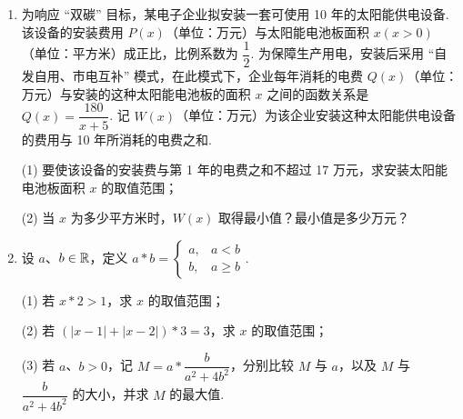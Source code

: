 \documentclass[a4paper,11pt]{article}
\begin{document}
\begin{enumerate}
\item 为响应 “双碳” 目标，某电子企业拟安装一套可使用 10 年的太阳能供电设备. 该设备的安装费用 $P(x)$（单位：万元）与太阳能电池板面积 $x(x>0)$（单位：平方米）成正比，比例系数为 $\dfrac12$. 为保障生产用电，安装后采用 “自发自用、市电互补” 模式，在此模式下，企业每年消耗的电费 $Q(x)$（单位：万元）与安装的这种太阳能电池板的面积 $x$ 之间的函数关系是 $Q(x)=\dfrac{180}{x+5}$. 记 $W(x)$（单位：万元）为该企业安装这种太阳能供电设备的费用与 10 年所消耗的电费之和.

(1) 要使该设备的安装费与第 1 年的电费之和不超过 17 万元，求安装太阳能电池板面积 $x$ 的取值范围；

(2) 当 $x$ 为多少平方米时，$W(x)$ 取得最小值？最小值是多少万元？

\ifanswer
\solbegin
{}
\solend
\fi

\item 设 $a$、$b\in\mathbb{R}$，定义 $a*b=\begin{cases}a,&a<b\\b,&a\geqslant b\end{cases}$.

(1) 若 $x*2>1$，求 $x$ 的取值范围；

(2) 若 $(\lvert x-1\rvert+\lvert x-2\rvert)*3=3$，求 $x$ 的取值范围；

(3) 若 $a$、$b>0$，记 $M=a*\dfrac{b}{a^2+4b^2}$，分别比较 $M$ 与 $a$，以及 $M$ 与 $\dfrac{b}{a^2+4b^2}$ 的大小，并求 $M$ 的最大值.


\end{enumerate}
\end{document}
